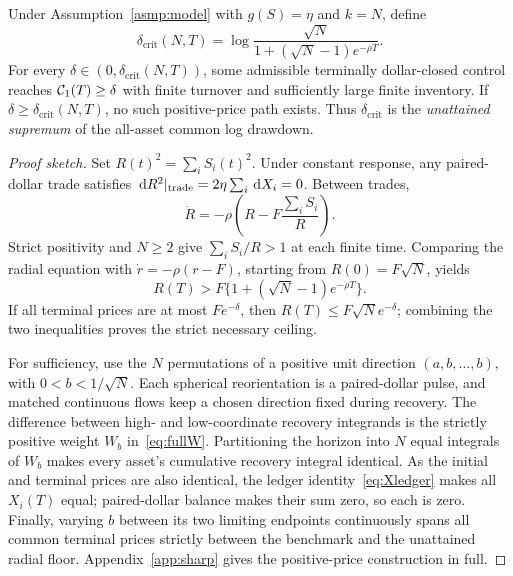 \documentclass[review,hidelinks,onefignum,onetabnum]{siamonline250211}
\begin{document}
\begin{theorem}\label{thm:critical}
Under Assumption~\ref{asmp:model} with $g(S)=\eta$ and $k=N$, define
\begin{equation}\label{eq:critical}
\delta_{\mathrm{crit}}(N,T)=
\log\frac{\sqrt N}{1+(\sqrt N-1)e^{-\rho T}}.
\end{equation}
For every $\delta\in(0,\delta_{\mathrm{crit}}(N,T))$, some admissible terminally dollar-closed control reaches $\mathcal{C}_1(T)\ge\delta$ with finite turnover and sufficiently large finite inventory. If $\delta\ge\delta_{\mathrm{crit}}(N,T)$, no such positive-price path exists. Thus $\delta_{\mathrm{crit}}$ is the \emph{unattained supremum} of the all-asset common log drawdown.
\end{theorem}
\begin{proof}[Proof sketch]
Set $R(t)^2=\sum_iS_i(t)^2$. Under constant response,
any paired-dollar trade satisfies
$\,\mathrm{d} R^2|_{\rm trade}=2\eta\sum_i\,\mathrm{d} X_i=0$.
Between trades,
\[
\dot R=-\rho\left(R-F\frac{\sum_iS_i}{R}\right).
\]
Strict positivity and $N\ge2$ give
$\sum_iS_i/R>1$ at each finite time. Comparing the
radial equation with $\dot r=-\rho(r-F)$, starting from
$R(0)=F\sqrt N$, yields
\[
R(T)>F\{1+(\sqrt N-1)e^{-\rho T}\}.
\]
If all terminal prices are at most $Fe^{-\delta}$,
then $R(T)\le F\sqrt N e^{-\delta}$; combining the
two inequalities proves the strict necessary ceiling.

For sufficiency, use the $N$ permutations of a positive
unit direction $(a,b,\ldots,b)$, with
$0<b<1/\sqrt N$. Each spherical reorientation is a
paired-dollar pulse, and matched continuous flows keep
a chosen direction fixed during recovery. The difference
between high- and low-coordinate recovery integrands is
the strictly positive weight $W_b$ in~\eqref{eq:fullW}.
Partitioning the horizon into $N$ equal integrals of
$W_b$ makes every asset's cumulative recovery integral
identical. As the initial and terminal prices are also
identical, the ledger identity~\eqref{eq:Xledger} makes
all $X_i(T)$ equal; paired-dollar balance makes their
sum zero, so each is zero. Finally, varying $b$ between
its two limiting endpoints continuously spans all common
terminal prices strictly between the benchmark and the
unattained radial floor. Appendix~\ref{app:sharp} gives
the positive-price construction in full.
\end{proof}
\end{document}
